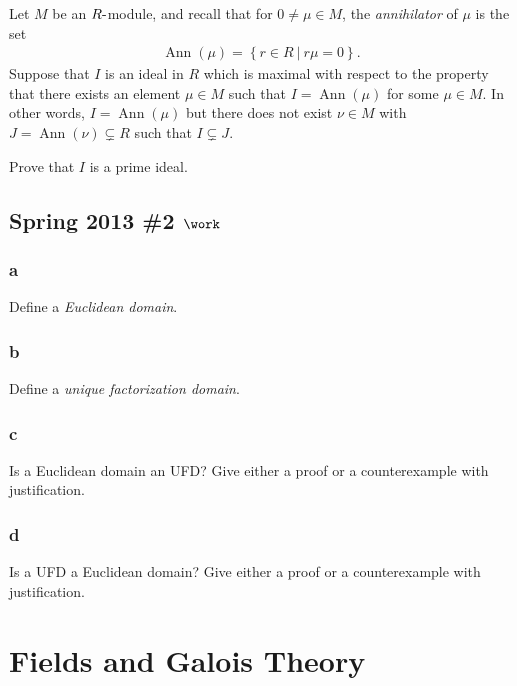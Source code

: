 Let \(M\) be an \(R{\hbox{-}}\)module, and recall that for
\(0\neq \mu \in M\), the \emph{annihilator} of \(\mu\) is the set
\begin{align*}
\operatorname{Ann}(\mu) = \left\{{r\in R {~\mathrel{\Big|}~}r\mu = 0}\right\}
.\end{align*}
Suppose that \(I\) is an ideal in \(R\) which is maximal with respect to
the property that there exists an element \(\mu \in M\) such that
\(I = \operatorname{Ann}(\mu)\) for some \(\mu \in M\). In other words,
\(I = \operatorname{Ann}(\mu)\) but there does not exist \(\nu\in M\)
with \(J = \operatorname{Ann}(\nu) \subsetneq R\) such that
\(I\subsetneq J\).

Prove that \(I\) is a prime ideal.

\hypertarget{spring-2013-2-work}{%
\subsection{\texorpdfstring{Spring 2013 \#2
\(\work\)}{Spring 2013 \#2 \textbackslash work}}\label{spring-2013-2-work}}

\hypertarget{a-49}{%
\subsubsection{a}\label{a-49}}

Define a \emph{Euclidean domain}.

\hypertarget{b-39}{%
\subsubsection{b}\label{b-39}}

Define a \emph{unique factorization domain}.

\hypertarget{c-26}{%
\subsubsection{c}\label{c-26}}

Is a Euclidean domain an UFD? Give either a proof or a counterexample
with justification.

\hypertarget{d-11}{%
\subsubsection{d}\label{d-11}}

Is a UFD a Euclidean domain? Give either a proof or a counterexample
with justification.

\hypertarget{fields-and-galois-theory}{%
\section{Fields and Galois Theory}\label{fields-and-galois-theory}}

